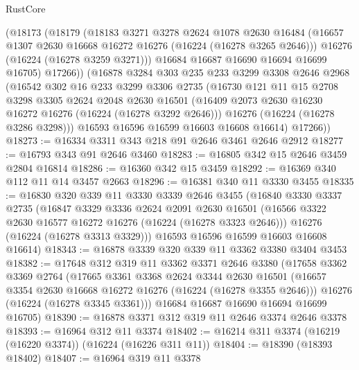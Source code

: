 \begin{lexlean}{RustCore}
\begin{coremodule}
        (@18173
          (@18179
            (@18183
              @3271
              @3278
              @2624
              @1078
              @2630
              @16484
              (@16657 @1307 @2630 @16668 @16272 @16276 (@16224 (@16278 @3265 @2646)))
              @16276
              (@16224 (@16278 @3259 @3271)))
            @16684
            @16687
            @16690
            @16694
            @16699
            @16705)
          @17266))
      (@16878
        @3284
        @303
        @235
        @233
        @3299
        @3308
        @2646
        @2968
        (@16542
          @302
          @16
          @233
          @3299
          @3306
          @2735
          (@16730
            @121
            @11
            @15
            @2708
            @3298
            @3305
            @2624
            @2048
            @2630
            @16501
            (@16409 @2073 @2630 @16230 @16272 @16276 (@16224 (@16278 @3292 @2646)))
            @16276
            (@16224 (@16278 @3286 @3298)))
          @16593
          @16596
          @16599
          @16603
          @16608
          @16614)
        @17266))
@18273 := @16334 @3311 @343 @218 @91 @2646 @3461 @2646 @2912
@18277 := @16793 @343 @91 @2646 @3460
@18283 := @16805 @342 @15 @2646 @3459 @2804 @16814
@18286 := @16360 @342 @15 @3459
@18292 := @16369 @340 @112 @11 @14 @3457 @2663
@18296 := @16381 @340 @11 @3330 @3455
@18335 := @16830
    @320
    @339
    @11
    @3330
    @3339
    @2646
    @3455
    (@16840
      @3330
      @3337
      @2735
      (@16847
        @3329
        @3336
        @2624
        @2091
        @2630
        @16501
        (@16566 @3322 @2630 @16577 @16272 @16276 (@16224 (@16278 @3323 @2646)))
        @16276
        (@16224 (@16278 @3313 @3329)))
      @16593
      @16596
      @16599
      @16603
      @16608
      @16614)
@18343 := @16878 @3339 @320 @339 @11 @3362 @3380 @3404 @3453
@18382 := @17648
    @312
    @319
    @11
    @3362
    @3371
    @2646
    @3380
    (@17658
      @3362
      @3369
      @2764
      (@17665
        @3361
        @3368
        @2624
        @3344
        @2630
        @16501
        (@16657 @3354 @2630 @16668 @16272 @16276 (@16224 (@16278 @3355 @2646)))
        @16276
        (@16224 (@16278 @3345 @3361)))
      @16684
      @16687
      @16690
      @16694
      @16699
      @16705)
@18390 := @16878 @3371 @312 @319 @11 @2646 @3374 @2646 @3378
@18393 := @16964 @312 @11 @3374
@18402 := @16214 @311 @3374 (@16219 (@16220 @3374)) (@16224 (@16226 @311 @11))
@18404 := @18390 (@18393 @18402)
@18407 := @16964 @319 @11 @3378

\end{coremodule}
\end{lexlean}
